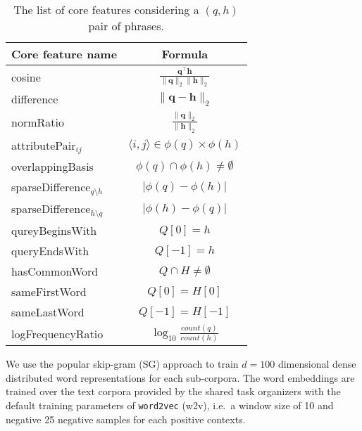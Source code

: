 \documentclass[11pt,a4paper]{article}
\begin{document}
\begin{table}
	\begin{tabular}{lc}
    \toprule
		Core feature name   & Formula \\
    \midrule
		{cosine}            & $\frac{\mathbf{q}^\intercal \mathbf{h}}{\lVert \mathbf{q} \rVert_2\lVert \mathbf{h} \rVert_2}$ \\ %
		{difference}        & $\lVert \mathbf{q} - \mathbf{h} \rVert_2$ \\ %
		{normRatio}         & $\frac{\lVert \mathbf{q}\rVert_2}{\lVert \mathbf{h} \rVert_2}$ \\ %
    \midrule
    attributePair$_{ij}$      & $\langle i,j\rangle\in\phi(q)\times\phi(h)$ \\ %
		{overlappingBasis}  & $\phi(q) \cap \phi(h) \neq \emptyset$ \\ %
		{sparseDifference$_{q\setminus h}$} & $\lvert \phi(q) - \phi(h) \rvert$ \\ %
		{sparseDifference$_{h\setminus q}$} & $\lvert \phi(h) - \phi(q) \rvert$ \\
    \midrule
		{qureyBeginsWith}   & $Q[0] = h$ \\ %
		{queryEndsWith}     & $Q[-1] = h$ \\
		{hasCommonWord} & $Q \cap H \neq \emptyset$ \\ %
		{sameFirstWord}        & $Q[0] = H[0]$ \\ %
		{sameLastWord}        & $Q[-1] = H[-1]$ \\
		{logFrequencyRatio} & $\log_{10}\frac{count(q)}{count(h)}$ \\ %
    \bottomrule
	\end{tabular}
	\caption{The list of core features considering a $(q,h)$ pair of phrases.}
	\label{table:core_features}
\end{table}

We use the popular skip-gram (SG) %
approach \citep{Mikolov:2013f} to train $d=100$ dimensional dense distributed
word representations for each sub-corpora. The word embeddings are trained over the text corpora provided by the shared task organizers with the default training parameters of \texttt{word2vec} (w2v), i.e.~a window size of 10 and negative 25 negative samples for each positive contexts.
\end{document}
